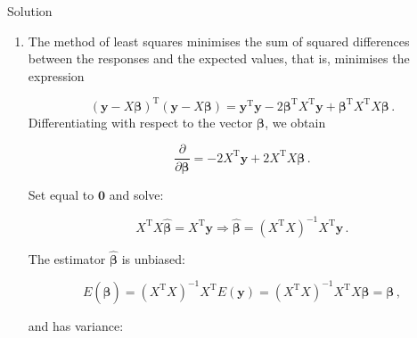 \documentclass[
]{book}
\theoremstyle{definition}
\theoremstyle{definition}
\theoremstyle{definition}
\theoremstyle{definition}
\theoremstyle{remark}
\begin{document}
Solution

\begin{enumerate}
\def\labelenumi{\alph{enumi}.}
\item
  The method of least squares minimises the sum of squared differences between the responses and the expected values, that is, minimises the expression

  \[
   (\boldsymbol{y}-X\boldsymbol{\beta})^{\mathrm{T}}(\boldsymbol{y}-X\boldsymbol{\beta}) = \boldsymbol{y}^{\mathrm{T}}\boldsymbol{y}- 2\boldsymbol{\beta}^{\mathrm{T}}X^{\mathrm{T}}\boldsymbol{y}+ \boldsymbol{\beta}^{\mathrm{T}}X^{\mathrm{T}}X\boldsymbol{\beta}\,.
   \]
  Differentiating with respect to the vector \(\boldsymbol{\beta}\), we obtain

  \[
   \frac{\partial}{\partial\boldsymbol{\beta}} = -2X^{\mathrm{T}}\boldsymbol{y}+ 2X^{\mathrm{T}}X\boldsymbol{\beta}\,.
   \]

  Set equal to \(\boldsymbol{0}\) and solve:

  \[
   X^{\mathrm{T}}X\hat{\boldsymbol{\beta}} = X^{\mathrm{T}}\boldsymbol{y}\Rightarrow \hat{\boldsymbol{\beta}} = \left(X^{\mathrm{T}}X\right)^{-1}X^{\mathrm{T}}\boldsymbol{y}\,.
   \]

  The estimator \(\hat{\boldsymbol{\beta}}\) is unbiased:

  \[
   E(\hat{\boldsymbol{\beta}}) = \left(X^{\mathrm{T}}X\right)^{-1}X^{\mathrm{T}}E(\boldsymbol{y}) = \left(X^{\mathrm{T}}X\right)^{-1}X^{\mathrm{T}}X\boldsymbol{\beta}= \boldsymbol{\beta}\,,
   \]

  and has variance:


\end{enumerate}
\end{document}
